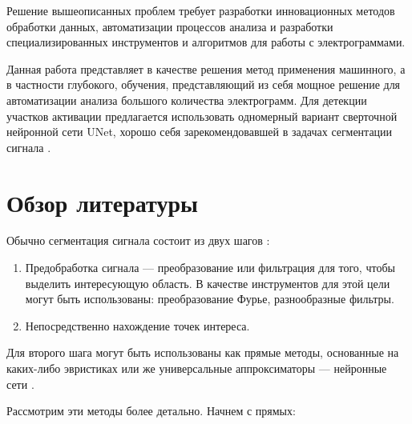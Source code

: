 Решение вышеописанных проблем требует разработки инновационных методов обработки данных,
автоматизации процессов анализа и разработки специализированных инструментов и
алгоритмов для работы с электрограммами.

Данная работа представляет в качестве решения метод применения машинного, а в
частности глубокого, обучения, представляющий из себя мощное решение для
автоматизации анализа большого количества электрограмм. Для детекции участков
активации предлагается использовать одномерный вариант сверточной нейронной
сети UNet, хорошо себя зарекомендовавшей в задачах сегментации сигнала \cite{victor}.

\section{Обзор литературы}
Обычно сегментация сигнала состоит из двух шагов \cite{ecg-segmentation}:

\begin{enumerate}
	\item Предобработка сигнала --- преобразование или фильтрация для того,
	      чтобы выделить интересующую область. В качестве инструментов для этой цели
	      могут быть использованы: преобразование Фурье, разнообразные фильтры.

	\item Непосредственно нахождение точек интереса.

\end{enumerate}

Для второго шага могут быть использованы как прямые методы, основанные на
каких-либо эвристиках \cite{euristic-1, euristic-2, euristic-3, euristic-4,
	euristic-5} или же универсальные аппроксиматоры --- нейронные сети
\cite{victor}.

Рассмотрим эти методы более детально. Начнем с прямых:

\vspace*{\baselineskip}

